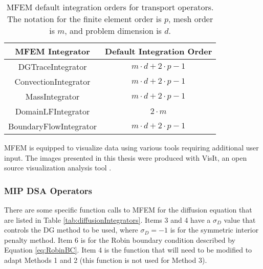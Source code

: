 \documentclass{article}
\begin{document}
\begin{table}[!h]
\centering
{\renewcommand{\arraystretch}{2}
\begin{tabular}{|c|c|}
\hline
\multicolumn{1}{|c}{\textbf{MFEM Integrator}} & \multicolumn{1}{|c|}{\textbf{Default Integration Order}} \\
\hline \hline
DGTraceIntegrator & $m \cdot d + 2 \cdot p - 1$ \\
\hline
ConvectionIntegrator & $m \cdot d + 2 \cdot p - 1$ \\
\hline
MassIntegrator & $m \cdot d + 2 \cdot p - 1$ \\
\hline
DomainLFIntegrator & $2 \cdot m$ \\
\hline
BoundaryFlowIntegrator & $m \cdot d + 2 \cdot p - 1$ \\
\hline
\end{tabular}}
\caption{MFEM default integration orders for transport operators. The notation for the finite element order is $p$, mesh order is $m$, and problem dimension is $d$.}
\label{tab:integrationOrders}
\end{table}

MFEM is equipped to visualize data using various tools requiring additional user input. The images presented in this thesis were produced with VisIt, an open source visualization analysis tool \cite{VisIt_Web}.

\FloatBarrier

\subsubsection{MIP DSA Operators}
\label{subsub:MIPDSAOperators}
There are some specific function calls to MFEM for the diffusion equation that are listed in Table \ref{tab:diffusionIntegrators}. Items 3 and 4 have a $\sigma_D$ value that controls the DG method to be used, where $\sigma_D = -1$ is for the symmetric interior penalty method. Item 6 is for the Robin boundary condition described by Equation \ref{eq:RobinBC}. Item 4 is the function that will need to be modified to adapt Methods 1 and 2 (this function is not used for Method 3).
\end{document}
